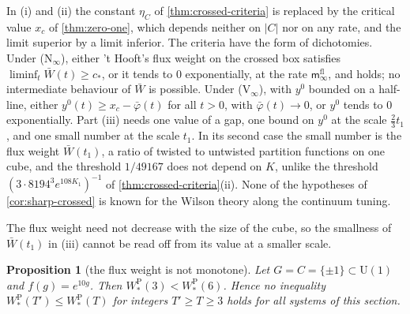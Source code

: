 \documentclass[11pt,a4paper]{amsart}
\newtheorem{proposition}[theorem]{Proposition}
\theoremstyle{definition}
\theoremstyle{remark}
\numberwithin{equation}{section}
\newcommand{\abs}[1]{\lvert #1\rvert}      %
\newcommand{\U}{\mathrm{U}}                %
\newcommand{\Mcirc}{\text{\upshape(M$^{\circ}$)}}   %
\begin{document}
In (i) and (ii) the constant $\eta_C$ of \cref{thm:crossed-criteria} is replaced by the critical value $x_c$ of \cref{thm:zero-one}, which depends neither on $\abs{C}$ nor on any rate, and the limit superior by a limit inferior. The criteria have the form of dichotomies. Under \textup{(N$_\infty$)}, either 't Hooft's flux weight on the crossed box satisfies $\liminf_t\bar W(t)\ge c_*$, or it tends to $0$ exponentially, at the rate $\mathsf m^{\mathrm{fl}}_\infty$, and \Mcirc{} holds; no intermediate behaviour of $\bar W$ is possible. Under \textup{(V$_\infty$)}, with $y^0$ bounded on a half-line, either $y^0(t)\ge x_c-\bar\varphi(t)$ for all $t>0$, with $\bar\varphi(t)\to0$, or $y^0$ tends to $0$ exponentially. Part (iii) needs one value of a gap, one bound on $y^0$ at the scale $\frac23t_1$, and one small number at the scale $t_1$. In its second case the small number is the flux weight $\bar W(t_1)$, a ratio of twisted to untwisted partition functions on one cube, and the threshold $1/49167$ does not depend on $K$, unlike the threshold $(3\cdot8194^3e^{108K_1})^{-1}$ of \cref{thm:crossed-criteria}\textup{(ii)}. None of the hypotheses of \cref{cor:sharp-crossed} is known for the Wilson theory along the continuum tuning.

The flux weight need not decrease with the size of the cube, so the smallness of $\bar W(t_1)$ in (iii) cannot be read off from its value at a smaller scale.

\begin{proposition}[the flux weight is not monotone]\label{prop:flux-nonmonotone}
Let $G=C=\{\pm1\}\subset\U(1)$ and $f(g)=e^{10g}$. Then $W^{\mathrm P}_*(3)<W^{\mathrm P}_*(6)$. Hence no inequality $W^{\mathrm P}_*(T')\le W^{\mathrm P}_*(T)$ for integers $T'\ge T\ge3$ holds for all systems of this section.
\end{proposition}
\end{document}
